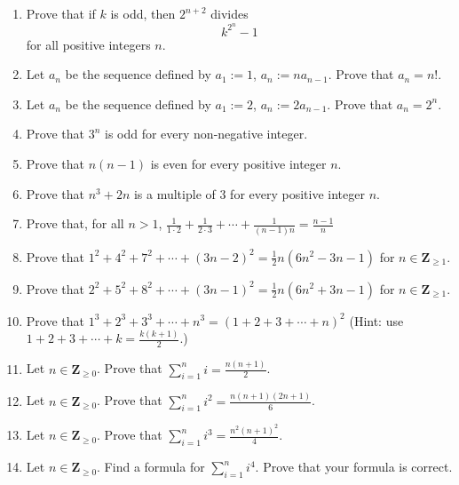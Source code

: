 \documentclass[12pt, reqno]{amsart}
\begin{document}
\begin{enumerate}
\newpage
\item Prove that if $k$ is odd, then $2^{n+2}$ divides 
\[
k^{2^n} -1
\] 
for all positive integers $n$.



\item Let $a_n$ be the sequence defined by $a_1 := 1$, $a_n := na_{n-1}$. Prove that $a_n = n!$.\vspace{0.3cm}
\item Let $a_n$ be the sequence defined by $a_1 := 2$, $a_n := 2a_{n-1}$. Prove that $a_n = 2^n$.\vspace{0.3cm}
\item Prove that $3^n$ is odd for every non-negative integer.\vspace{0.3cm}
\item Prove that $n(n-1)$ is even for every positive integer $n$.\vspace{0.3cm}
\item Prove that $n^3 + 2n$ is a multiple of 3 for every positive integer $n$.\vspace{0.3cm}
\item Prove that, for all $n > 1$, $\frac{1}{1\cdot 2} + \frac{1}{2 \cdot 3} + \cdots + \frac{1}{(n-1)n} = \frac{n-1}{n}$\vspace{0.3cm}
\item Prove that $1^2 + 4^2 + 7^2 + \cdots + (3n-2)^2 = \frac{1}{2}n(6n^2 - 3n - 1)$ for $n \in \mathbf{Z}_{\geq 1}$.\vspace{0.3cm}
\item Prove that $2^2 + 5^2 + 8^2 + \cdots + (3n-1)^2 = \frac{1}{2}n(6n^2 + 3n - 1)$ for $n \in \mathbf{Z}_{\geq 1}$.\vspace{0.3cm}
\item Prove that $1^3 + 2^3 + 3^3 + \cdots + n^3 = (1 + 2 + 3 + \cdots + n)^2$ (Hint: use $1 + 2 + 3 + \cdots + k = \frac{k(k+1)}{2}$.)\vspace{0.3cm}
\item Let $n \in \mathbf{Z}_{\geq 0}$. Prove that $\displaystyle{\sum}_{i = 1}^n i = \frac{n(n+1)}{2}$.\vspace{0.3cm}
\item Let $n \in \mathbf{Z}_{\geq 0}$. Prove that $\displaystyle{\sum}_{i = 1}^n i^2 = \frac{n(n+1)(2n+1) }{6}$. \vspace{0.3cm}
\item Let $n \in \mathbf{Z}_{\geq 0}$. Prove that $\displaystyle{\sum}_{i = 1}^n i^3 = \frac{n^2(n+1)^2}{4}$.\vspace{0.3cm}
\item Let $n \in \mathbf{Z}_{\geq 0}$. Find a formula for $\displaystyle{\sum}_{i = 1}^n i^4$. Prove that your formula is correct. 
\vspace{0.3cm}


\end{enumerate}
\end{document}
